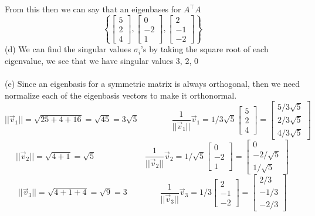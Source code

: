 \documentclass{report}
\begin{document}
From this then we can say that an eigenbases for $A^\top A$
$$
\left\{
\begin{bmatrix}5\\2\\4\end{bmatrix},\begin{bmatrix}0\\-2\\1\end{bmatrix},\begin{bmatrix}2\\-1\\-2\end{bmatrix}
\right\}
$$
(d) We can find the singular values $\sigma_i$'s by taking the square root of each eigenvalue, we see that we have singular values 3, 2, 0 \\
\\
\noindent (e) Since an eigenbasis for a symmetric matrix is always orthogonal, then we need normalize each of the eigenbasis vectors to make it orthonormal.
$$
||\vec{v}_1|| = \sqrt{25 + 4 + 16} = \sqrt{45} = 3\sqrt{5}\qquad\qquad\frac{1}{||\vec{v}_1||}\vec{v}_1 = 1/3\sqrt{5}\begin{bmatrix}5\\2\\4\end{bmatrix}=\begin{bmatrix}5/3\sqrt{5}\\2/3\sqrt{5}\\4/3\sqrt{5}\end{bmatrix}
$$
$$
||\vec{v}_2|| = \sqrt{4+1} = \sqrt{5}\qquad\qquad\qquad\frac{1}{||\vec{v}_2||}\vec{v}_2 = 1/\sqrt{5}\begin{bmatrix}0\\-2\\1\end{bmatrix} = \begin{bmatrix}0\\-2/\sqrt{5}\\1/\sqrt{5}\end{bmatrix}
$$
$$
||\vec{v}_3|| = \sqrt{4+1+4} = \sqrt{9} = 3\qquad\qquad\frac{1}{||\vec{v}_3||}\vec{v}_3 = 1/3\begin{bmatrix}2\\-1\\-2\end{bmatrix} = \begin{bmatrix}2/3\\-1/3\\-2/3\end{bmatrix}
$$
\end{document}

